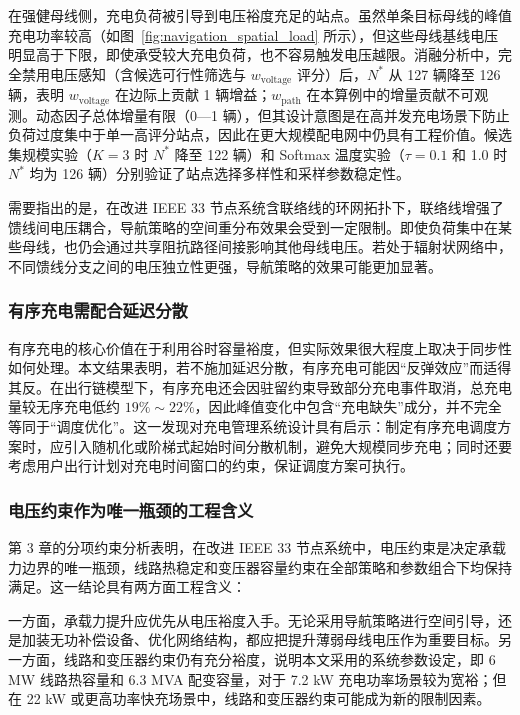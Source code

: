 \documentclass[10pt,a4paper]{article}
\numberwithin{equation}{section}
\numberwithin{table}{section}
\numberwithin{figure}{section}
\begin{document}
    在强健母线侧，充电负荷被引导到电压裕度充足的站点。虽然单条目标母线的峰值充电功率较高（如图~\ref{fig:navigation_spatial_load} 所示），但这些母线基线电压明显高于下限，即使承受较大充电负荷，也不容易触发电压越限。消融分析中，完全禁用电压感知（含候选可行性筛选与 $w_{\text{voltage}}$ 评分）后，$N^*$ 从 127 辆降至 126 辆，表明 $w_{\text{voltage}}$ 在边际上贡献 1 辆增益；$w_{\text{path}}$ 在本算例中的增量贡献不可观测。动态因子总体增量有限（0—1 辆），但其设计意图是在高并发充电场景下防止负荷过度集中于单一高评分站点，因此在更大规模配电网中仍具有工程价值。候选集规模实验（$K = 3$ 时 $N^*$ 降至 122 辆）和 Softmax 温度实验（$\tau = 0.1$ 和 1.0 时 $N^*$ 均为 126 辆）分别验证了站点选择多样性和采样参数稳定性。

    需要指出的是，在改进 IEEE 33 节点系统含联络线的环网拓扑下，联络线增强了馈线间电压耦合，导航策略的空间重分布效果会受到一定限制。即使负荷集中在某些母线，也仍会通过共享阻抗路径间接影响其他母线电压。若处于辐射状网络中，不同馈线分支之间的电压独立性更强，导航策略的效果可能更加显著。

    \subsubsection{有序充电需配合延迟分散}

    有序充电的核心价值在于利用谷时容量裕度，但实际效果很大程度上取决于同步性如何处理。本文结果表明，若不施加延迟分散，有序充电可能因“反弹效应”而适得其反。在出行链模型下，有序充电还会因驻留约束导致部分充电事件取消，总充电量较无序充电低约 $19\%\sim22\%$，因此峰值变化中包含“充电缺失”成分，并不完全等同于“调度优化”。这一发现对充电管理系统设计具有启示：制定有序充电调度方案时，应引入随机化或阶梯式起始时间分散机制，避免大规模同步充电；同时还要考虑用户出行计划对充电时间窗口的约束，保证调度方案可执行。

    \subsubsection{电压约束作为唯一瓶颈的工程含义}

    第 3 章的分项约束分析表明，在改进 IEEE 33 节点系统中，电压约束是决定承载力边界的唯一瓶颈，线路热稳定和变压器容量约束在全部策略和参数组合下均保持满足。这一结论具有两方面工程含义：

    一方面，承载力提升应优先从电压裕度入手。无论采用导航策略进行空间引导，还是加装无功补偿设备、优化网络结构，都应把提升薄弱母线电压作为重要目标。另一方面，线路和变压器约束仍有充分裕度，说明本文采用的系统参数设定，即 6 MW 线路热容量和 6.3 MVA 配变容量，对于 7.2 kW 充电功率场景较为宽裕；但在 22 kW 或更高功率快充场景中，线路和变压器约束可能成为新的限制因素。
\end{document}
